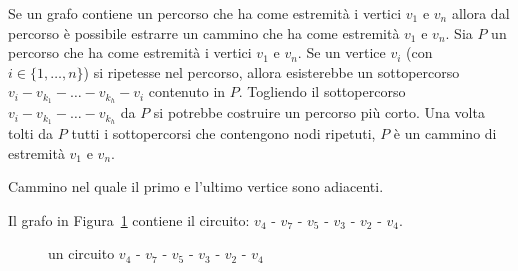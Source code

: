 \begin{thm}
	Se un grafo contiene un percorso che ha come estremità i vertici $v_1$ e $v_n$ allora dal percorso è possibile estrarre un cammino che ha come estremità $v_1$ e $v_n$.
	\proof
	Sia $P$ un percorso che ha come estremità i vertici $v_1$ e $v_n$. Se un vertice $v_i$ (con $i \in \{1,\dots,n\}$) si ripetesse nel percorso, allora esisterebbe un sottopercorso $v_i - v_{k_1} - \dots - v_{k_h} - v_i$ contenuto in $P$. Togliendo il sottopercorso $v_i - v_{k_1} - \dots - v_{k_h}$ da $P$ si potrebbe costruire un percorso più corto. Una volta tolti da $P$ tutti i sottopercorsi che contengono nodi ripetuti, $P$ è un cammino di estremità $v_1$ e $v_n$.
	\endproof
\end{thm}

\begin{defn}[circuito]
Cammino nel quale il primo e l'ultimo vertice sono adiacenti.
\end{defn}
\begin{ese}
Il grafo in Figura~\ref{fig:circ_semplice} contiene il circuito:
$v_4 \text{ - } v_7 \text{ - } v_5 \text{ - } v_3 \text{ - } v_2 \text{ - } v_4$.
    \begin{figure}[H]
    \centering
        \caption{ un circuito 
            $v_4 \text{ - } v_7 \text{ - } v_5 \text{ - } v_3 \text{ - } v_2 \text{ - } v_4$}
        \label{fig:circ_semplice}
    \end{figure}
	\QEDA
\end{ese}


